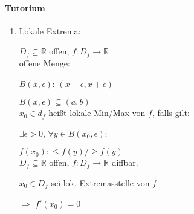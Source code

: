 \newpage

\paragraph{Tutorium}

\begin{enumerate}

\item[]

Lokale Extrema:

$D_f\subseteq \mathbb{R}$ offen, $f:D_f\rightarrow\mathbb{R}$\\

offene Menge:

$B(x,\epsilon)$: $(x-\epsilon,x+\epsilon)$

$B(x,\epsilon)\subseteq(a,b)$\\

$x_0\in d_f$ heißt lokale Min/Max von $f$, falls gilt:

$\exists\epsilon>0$, $\forall y\in B(x_0,\epsilon)$:

$f(x_0):\leq f(y)/\geq f(y)$\\

$D_f\subseteq \mathbb{R}$ offen, $f:D_f\rightarrow\mathbb{R}$ diffbar.

$x_0\in D_f$ sei lok. Extremasstelle von $f$

$\Rightarrow$ $f'(x_0)=0$

\end{enumerate}